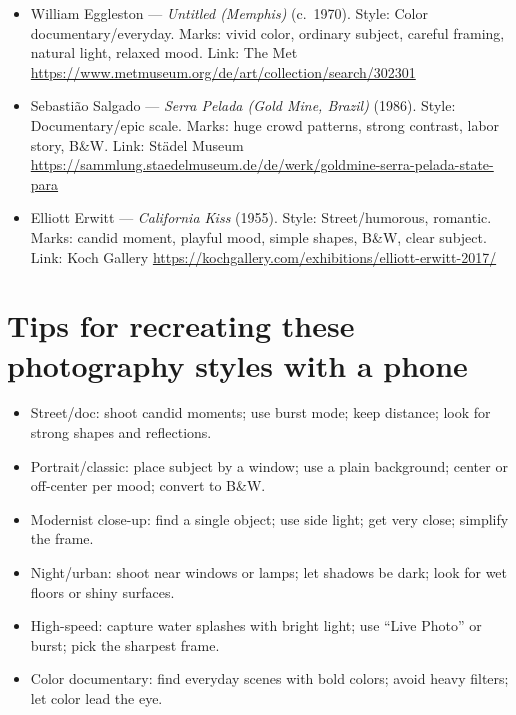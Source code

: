 \documentclass[12pt]{article}
\begin{document}
\begin{itemize}
  \item William Eggleston — \emph{Untitled (Memphis)} (c.\ 1970). Style: Color documentary/everyday. Marks: vivid color, ordinary subject, careful framing, natural light, relaxed mood. Link: The Met \url{https://www.metmuseum.org/de/art/collection/search/302301}
  \item Sebastião Salgado — \emph{Serra Pelada (Gold Mine, Brazil)} (1986). Style: Documentary/epic scale. Marks: huge crowd patterns, strong contrast, labor story, B\&W. Link: Städel Museum \url{https://sammlung.staedelmuseum.de/de/werk/goldmine-serra-pelada-state-para}
  \item Elliott Erwitt — \emph{California Kiss} (1955). Style: Street/humorous, romantic. Marks: candid moment, playful mood, simple shapes, B\&W, clear subject. Link: Koch Gallery \url{https://kochgallery.com/exhibitions/elliott-erwitt-2017/}
\end{itemize}

\section*{Tips for recreating these photography styles with a phone}
\begin{itemize}
  \item Street/doc: shoot candid moments; use burst mode; keep distance; look for strong shapes and reflections.
  \item Portrait/classic: place subject by a window; use a plain background; center or off-center per mood; convert to B\&W.
  \item Modernist close-up: find a single object; use side light; get very close; simplify the frame.
  \item Night/urban: shoot near windows or lamps; let shadows be dark; look for wet floors or shiny surfaces.
  \item High-speed: capture water splashes with bright light; use ``Live Photo'' or burst; pick the sharpest frame.
  \item Color documentary: find everyday scenes with bold colors; avoid heavy filters; let color lead the eye.
\end{itemize}
\end{document}
